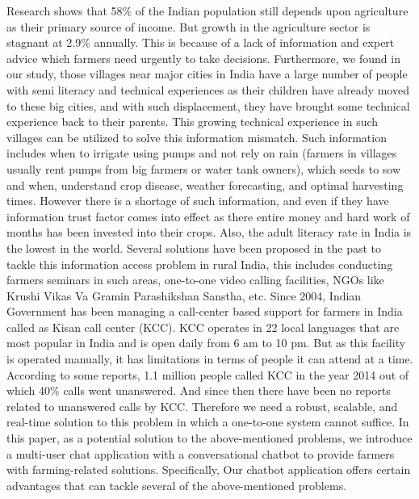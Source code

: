 \documentclass[10pt,conference]{IEEEtran}
\begin{document}
{\raggedright
Research \cite{botscognitive} shows that 58\% of the Indian population still depends upon agriculture as their primary source of income. But growth in the agriculture sector is stagnant at 2.9\% annually. This is because of a lack of information and expert advice which farmers need urgently to take decisions. Furthermore, we found in our study, those villages near major cities in India have a large number of people with semi literacy and technical experiences as their children have already moved to these big cities, and with such displacement, they have brought some technical experience back to their parents. This growing technical experience in such villages can be utilized to solve this information mismatch. Such information includes when to irrigate using pumps and not rely on rain (farmers in villages usually rent pumps from big farmers or water tank owners), which seeds to sow and when, understand crop disease, weather forecasting, and optimal harvesting times. However there is a shortage of such information, and even if they have information trust factor comes into effect as there entire money and hard work of months has been invested into their crops. Also, the adult literacy rate in India is the lowest in the world. 
\newline
Several solutions have been proposed in the past to tackle this information access problem in rural India, this includes conducting farmers seminars in such areas, one-to-one video calling facilities, NGOs like Krushi Vikas Va Gramin Parashikshan Sanstha, etc. Since 2004, Indian Government has been managing a call-center based support for farmers in India called as Kisan call center (KCC). KCC operates in 22 local languages that are most popular in India and is open daily from 6 am to 10 pm. But as this facility is operated manually, it has limitations in terms of people it can attend at a time. According to some reports, 1.1 million people called KCC in the year 2014 out of which 40\% calls went unanswered. And since then there have been no reports related to unanswered calls by KCC. Therefore we need a robust, scalable, and real-time solution to this problem in which a one-to-one system cannot suffice. In this paper, as a potential solution to the above-mentioned problems, we introduce a multi-user chat application with a conversational chatbot to provide farmers with farming-related solutions. Specifically, Our chatbot application offers certain advantages that can tackle several of the above-mentioned problems.
}
\end{document}
